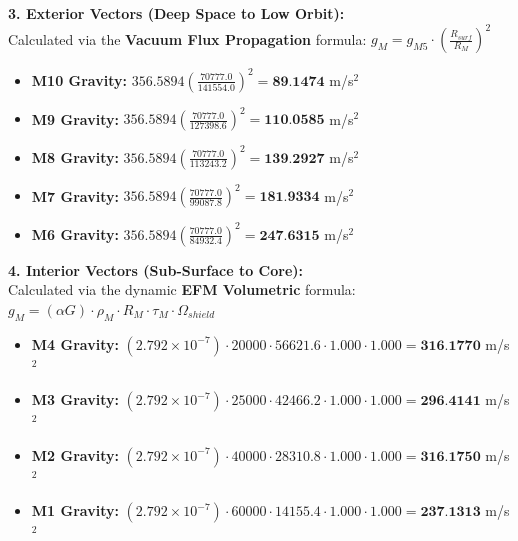 \documentclass[11pt, a4paper]{article}
\begin{document}
  \clearpage
  \noindent \textbf{3. Exterior Vectors (Deep Space to Low Orbit):} \\
  \hspace*{1em} Calculated via the \textbf{Vacuum Flux Propagation} formula: $g_M = g_{M5} \cdot \left( \frac{R_{surf}}{R_M} \right)^2$
  \begin{itemize}
    \item \textbf{M10 Gravity:} $356.5894 \left( \frac{70777.0}{141554.0} \right)^2 = \textbf{89.1474}$ m/s$^2$
    \item \textbf{M9 Gravity:} $356.5894 \left( \frac{70777.0}{127398.6} \right)^2 = \textbf{110.0585}$ m/s$^2$
    \item \textbf{M8 Gravity:} $356.5894 \left( \frac{70777.0}{113243.2} \right)^2 = \textbf{139.2927}$ m/s$^2$
    \item \textbf{M7 Gravity:} $356.5894 \left( \frac{70777.0}{99087.8} \right)^2 = \textbf{181.9334}$ m/s$^2$
    \item \textbf{M6 Gravity:} $356.5894 \left( \frac{70777.0}{84932.4} \right)^2 = \textbf{247.6315}$ m/s$^2$
  \end{itemize}

  \vspace{0.5em}
  \noindent \textbf{4. Interior Vectors (Sub-Surface to Core):} \\[0.5em]
  \hspace*{1em} Calculated via the dynamic \textbf{EFM Volumetric} formula: $g_M = (\alpha G) \cdot \rho_{M} \cdot R_M \cdot \tau_M \cdot \Omega_{shield}$
  \begin{itemize}
    \item \textbf{M4 Gravity:} $(2.792 \times 10^{-7}) \cdot 20000 \cdot 56621.6 \cdot 1.000 \cdot 1.000 = \textbf{316.1770}$ m/s$^2$
    \item \textbf{M3 Gravity:} $(2.792 \times 10^{-7}) \cdot 25000 \cdot 42466.2 \cdot 1.000 \cdot 1.000 = \textbf{296.4141}$ m/s$^2$
    \item \textbf{M2 Gravity:} $(2.792 \times 10^{-7}) \cdot 40000 \cdot 28310.8 \cdot 1.000 \cdot 1.000 = \textbf{316.1750}$ m/s$^2$
    \item \textbf{M1 Gravity:} $(2.792 \times 10^{-7}) \cdot 60000 \cdot 14155.4 \cdot 1.000 \cdot 1.000 = \textbf{237.1313}$ m/s$^2$
  \end{itemize}
\end{document}
